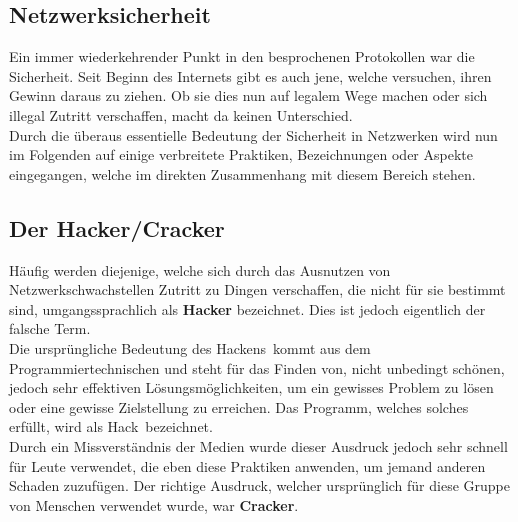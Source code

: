 \documentclass[12pt,a4paper]{report}
\begin{document}
\begin{onehalfspace}
\section{Netzwerksicherheit}\label{sec:security}
Ein immer wiederkehrender Punkt in den besprochenen Protokollen war die Sicherheit. Seit Beginn des Internets gibt es auch jene, welche versuchen, ihren Gewinn daraus zu ziehen. Ob sie dies nun auf legalem Wege machen oder sich illegal Zutritt verschaffen, macht da keinen Unterschied.\\

Durch die überaus essentielle Bedeutung der Sicherheit in Netzwerken wird nun im Folgenden auf einige verbreitete Praktiken, Bezeichnungen oder Aspekte eingegangen, welche im direkten Zusammenhang mit diesem Bereich stehen.
\subsection{Der Hacker/Cracker}
Häufig werden diejenige, welche sich durch das Ausnutzen von Netzwerkschwachstellen Zutritt zu Dingen verschaffen, die nicht für sie bestimmt sind, umgangssprachlich als \textbf{Hacker} bezeichnet. Dies ist jedoch eigentlich der falsche Term.\\

Die ursprüngliche Bedeutung des \glqq Hackens\grqq \ kommt aus dem Programmiertechnischen und steht für das Finden von, nicht unbedingt schönen, jedoch sehr effektiven Lösungsmöglichkeiten, um ein gewisses Problem zu lösen oder eine gewisse Zielstellung zu erreichen. Das Programm, welches solches erfüllt, wird als \glqq Hack\grqq \ bezeichnet.\\
Durch ein Missverständnis der Medien wurde dieser Ausdruck jedoch sehr schnell für Leute verwendet, die eben diese Praktiken anwenden, um jemand anderen Schaden zuzufügen. Der richtige Ausdruck, welcher ursprünglich für diese Gruppe von Menschen verwendet wurde, war \textbf{Cracker}.\\


\end{onehalfspace}
\end{document}
